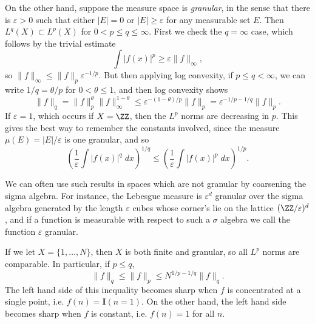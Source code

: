 \begin{example}
  On the other hand, suppose the measure space is {\it granular}, in the sense that there is $\varepsilon > 0$ such that either $|E| = 0$ or $|E| \geq \varepsilon$ for any measurable set $E$. Then $L^q(X) \subset L^p(X)$ for $0 < p \leq q \leq \infty$. First we check the $q = \infty$ case, which follows by the trivial estimate
  \[ \int |f(x)|^p \geq \varepsilon \| f \|_\infty, \]
  so $\| f \|_\infty \leq \| f \|_p \varepsilon^{-1/p}$. But then applying log convexity, if $p \leq q < \infty$, we can write $1/q = \theta/p$ for $0 < \theta \leq 1$, and then log convexity shows
  \[ \| f \|_q = \| f \|_p^\theta \| f \|_\infty^{1-\theta} \leq \varepsilon^{-(1 - \theta)/p} \| f \|_p = \varepsilon^{-1/p - 1/q} \| f \|_p. \]
  If $\varepsilon = 1$, which occurs if $X = \ZZ$, then the $L^p$ norms are decreasing in $p$. This gives the best way to remember the constants involved, since the measure $\mu(E) = |E|/\varepsilon$ is one granular, and so
  \[ \left( \frac{1}{\varepsilon} \int |f(x)|^q\; dx \right)^{1/q} \leq \left( \frac{1}{\varepsilon} \int |f(x)|^p\; dx \right)^{1/p}. \]
\end{example}



\begin{remark}
  We can often use such results in spaces which are not granular by coarsening the sigma algebra. For instance, the Lebesgue measure is $\varepsilon^d$ granular over the sigma algebra generated by the length $\varepsilon$ cubes whose corner's lie on the lattice $(\ZZ/\varepsilon)^d$, and if a function is measurable with respect to such a $\sigma$ algebra we call the function $\varepsilon$ granular.
\end{remark}

\begin{remark}
  If we let $X = \{ 1, \dots, N \}$, then $X$ is both finite and granular, so all $L^p$ norms are comparable. In particular, if $p \leq q$,
  \[ \| f \|_q \leq \| f \|_p \leq N^{1/p - 1/q} \| f \|_q. \]
  The left hand side of this inequality becomes sharp when $f$ is concentrated at a single point, i.e. $f(n) = \mathbf{I}(n = 1)$. On the other hand, the left hand side becomes sharp when $f$ is constant, i.e. $f(n) = 1$ for all $n$.
\end{remark}

